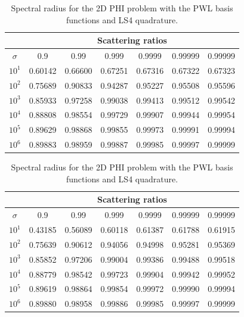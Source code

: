 \begin{table}
\caption{Spectral radius for the 2D PHI problem with the PWL basis functions and LS2 quadrature.}
\begin{center}
\def\arraystretch{1.6}
\begin{tabular}{|c|c|c|c|c|c|c|}
\hline
& \multicolumn{6}{c}{Scattering ratios}\vline\\
\hline
$\sigma$ & 0.9 & 0.99& 0.999& 0.9999& 0.99999& 0.99999 \\
\hline
$10^1$&0.60142&0.66600&0.67251&0.67316&0.67322&0.67323\\
$10^2$&0.75689&0.90833&0.94287&0.95227&0.95508&0.95596\\
$10^3$&0.85933&0.97258&0.99038&0.99413&0.99512&0.99542\\
$10^4$&0.88808&0.98554&0.99729&0.99907&0.99944&0.99954\\
$10^5$&0.89629&0.98868&0.99855&0.99973&0.99991&0.99994\\
$10^6$&0.89883&0.98959&0.99887&0.99985&0.99997&0.99999\\
\hline
\end{tabular}
\end{center}
\label{tab::DSA_2DPHI_LS2}
\vspace{2cm}
\caption{Spectral radius for the 2D PHI problem with the PWL basis functions and LS4 quadrature.}
\begin{center}
\def\arraystretch{1.6}
\begin{tabular}{|c|c|c|c|c|c|c|}
\hline
& \multicolumn{6}{c}{Scattering ratios}\vline\\
\hline
$\sigma$ & 0.9 & 0.99& 0.999& 0.9999& 0.99999& 0.99999 \\
\hline
$10^1$&0.43185&0.56089&0.60118&0.61387&0.61788&0.61915\\
$10^2$&0.75639&0.90612&0.94056&0.94998&0.95281&0.95369\\
$10^3$&0.85852&0.97206&0.99004&0.99386&0.99488&0.99518\\
$10^4$&0.88779&0.98542&0.99723&0.99904&0.99942&0.99952\\
$10^5$&0.89619&0.98864&0.99854&0.99972&0.99990&0.99994\\
$10^6$&0.89880&0.98958&0.99886&0.99985&0.99997&0.99999\\
\hline
\end{tabular}
\end{center}
\label{tab::DSA_2DPHI_LS4}
\end{table}

